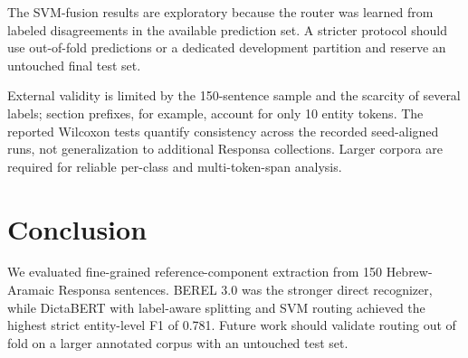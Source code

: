 \documentclass[conference,a4paper]{IEEEtran}
\begin{document}
The SVM-fusion results are exploratory because the router was learned from labeled disagreements in the available prediction set. A stricter protocol should use out-of-fold predictions or a dedicated development partition and reserve an untouched final test set.

External validity is limited by the 150-sentence sample and the scarcity of several labels; section prefixes, for example, account for only 10 entity tokens. The reported Wilcoxon tests quantify consistency across the recorded seed-aligned runs, not generalization to additional Responsa collections. Larger corpora are required for reliable per-class and multi-token-span analysis.

\section{Conclusion}

We evaluated fine-grained reference-component extraction from 150 Hebrew-Aramaic Responsa sentences. BEREL 3.0 was the stronger direct recognizer, while DictaBERT with label-aware splitting and SVM routing achieved the highest strict entity-level F1 of 0.781. Future work should validate routing out of fold on a larger annotated corpus with an untouched test set.
\end{document}
